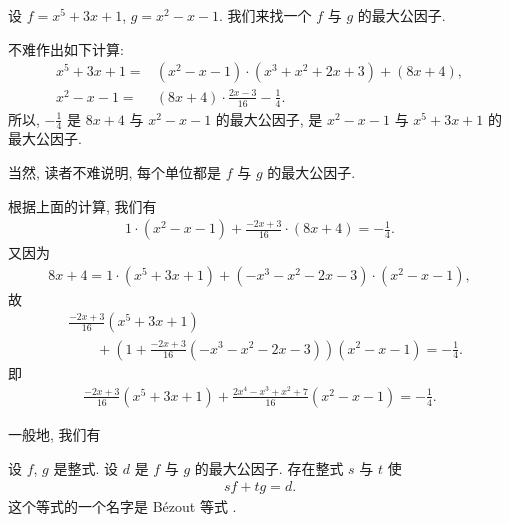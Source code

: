 \begin{example}
    设 $f = x^5 + 3x + 1$, $g = x^2 - x - 1$. 我们来找一个 $f$ 与 $g$ 的最大公因子.

    不难作出如下计算:
    \begin{align*}
        x^5 + 3x + 1 = {} & (x^2 - x - 1) \cdot (x^3 + x^2 + 2x + 3) + (8x + 4), \\
        x^2 - x - 1  = {} & (8x + 4) \cdot \frac{2x - 3}{16} - \frac{1}{4}.
    \end{align*}
    所以, $-\frac{1}{4}$ 是 $8x + 4$ 与 $x^2 - x - 1$ 的最大公因子, 是 $x^2 - x - 1$ 与 $x^5 + 3x + 1$ 的最大公因子.

    当然, 读者不难说明, 每个单位都是 $f$ 与 $g$ 的最大公因子.
\end{example}

根据上面的计算, 我们有
\begin{align*}
    1 \cdot (x^2 - x - 1) + \frac{-2x + 3}{16} \cdot (8x + 4) = -\frac{1}{4}.
\end{align*}
又因为
\begin{align*}
    8x + 4 = 1 \cdot (x^5 + 3x + 1) + (-x^3 - x^2 - 2x - 3) \cdot (x^2 - x - 1),
\end{align*}
故
\begin{align*}
     & \frac{-2x+3}{16} (x^5 + 3x + 1)                                                            \\
     & \qquad + \left( 1 + \frac{-2x+3}{16} (-x^3-x^2-2x-3) \right) (x^2 - x - 1) = -\frac{1}{4}.
\end{align*}
即
\begin{align*}
    \frac{-2x+3}{16} (x^5 + 3x + 1) + \frac{2x^4-x^3+x^2+7}{16} (x^2 - x - 1) = -\frac{1}{4}.
\end{align*}

一般地, 我们有
\begin{proposition}
    设 $f$, $g$ 是整式. 设 $d$ 是 $f$ 与 $g$ 的最大公因子. 存在整式 $s$ 与 $t$ 使
    \begin{align*}
        sf + tg = d.
    \end{align*}
    这个等式的一个名字是 Bézout 等式 .
\end{proposition}

